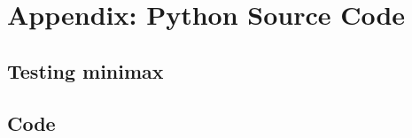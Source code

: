 \documentclass[11pt,a4paper,twoside]{article}
\begin{document}
\section{}





\FloatBarrier

\newpage
\section{Appendix: Python Source Code}
\label{sec:app}

\subsection{Testing minimax}
\label{sub:testing}


\subsection{Code}

\end{document}
